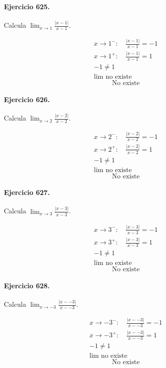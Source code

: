 \documentclass[11pt,a4paper]{article}
\begin{document}
\paragraph{Ejercicio 625.} Calcula $\displaystyle\lim_{x\to 1}\frac{|x-1|}{x-1}$. 

\[
\begin{aligned}
x\to 1^-:\quad \frac{|x-1|}{x-1}=-1\\
x\to 1^+:\quad \frac{|x-1|}{x-1}=1\\
-1\ne1\\
\lim\text{{ no existe}}
\end{aligned}
\]
\[\boxed{\text{{No existe}}}\]


\paragraph{Ejercicio 626.} Calcula $\displaystyle\lim_{x\to 2}\frac{|x-2|}{x-2}$. 

\[
\begin{aligned}
x\to 2^-:\quad \frac{|x-2|}{x-2}=-1\\
x\to 2^+:\quad \frac{|x-2|}{x-2}=1\\
-1\ne1\\
\lim\text{{ no existe}}
\end{aligned}
\]
\[\boxed{\text{{No existe}}}\]


\paragraph{Ejercicio 627.} Calcula $\displaystyle\lim_{x\to 3}\frac{|x-3|}{x-3}$. 

\[
\begin{aligned}
x\to 3^-:\quad \frac{|x-3|}{x-3}=-1\\
x\to 3^+:\quad \frac{|x-3|}{x-3}=1\\
-1\ne1\\
\lim\text{{ no existe}}
\end{aligned}
\]
\[\boxed{\text{{No existe}}}\]


\paragraph{Ejercicio 628.} Calcula $\displaystyle\lim_{x\to -3}\frac{|x--3|}{x--3}$. 

\[
\begin{aligned}
x\to -3^-:\quad \frac{|x--3|}{x--3}=-1\\
x\to -3^+:\quad \frac{|x--3|}{x--3}=1\\
-1\ne1\\
\lim\text{{ no existe}}
\end{aligned}
\]
\[\boxed{\text{{No existe}}}\]
\end{document}

